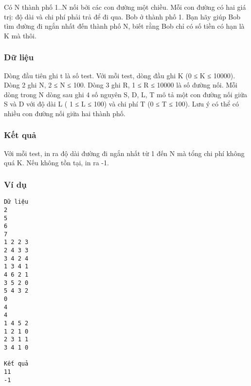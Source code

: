 



   Có N thành phố 1..N nối bởi các con đường một chiều. Mỗi con đường có hai giá trị: độ dài và chi phí phải trả để đi qua. Bob ở thành phố 1. Bạn hãy giúp Bob tìm đường đi ngắn nhất đến thành phố N, biết rằng Bob chỉ có số tiền có hạn là K mà thôi.  

\subsubsection{   Dữ liệu  }

   Dòng đầu tiên ghi t là số test. Với mỗi test, dòng đầu ghi K (0 ≤ K ≤ 10000). Dòng 2 ghi N, 2 ≤ N ≤ 100. Dòng 3 ghi R, 1 ≤ R ≤ 10000 là số đường nối. Mỗi dòng trong N dòng sau ghi 4 số nguyên S, D, L, T mô tả một con đường nối giữa S và D với độ dài L ( 1 ≤ L ≤ 100) và chi phí T (0 ≤ T ≤ 100). Lưu ý có thể có nhiều con đường nối giữa hai thành phố.  

\subsubsection{   Kết quả  }

   Với mỗi test, in ra độ dài đường đi ngắn nhất từ 1 đến N mà tổng chi phí không quá K. Nếu không tồn tại, in ra -1.  

\subsubsection{   Ví dụ  }
\begin{verbatim}
Dữ liệu
2
5
6
7
1 2 2 3
2 4 3 3
3 4 2 4
1 3 4 1
4 6 2 1
3 5 2 0
5 4 3 2
0
4
4
1 4 5 2
1 2 1 0
2 3 1 1
3 4 1 0

Kết quả
11
-1
\end{verbatim}